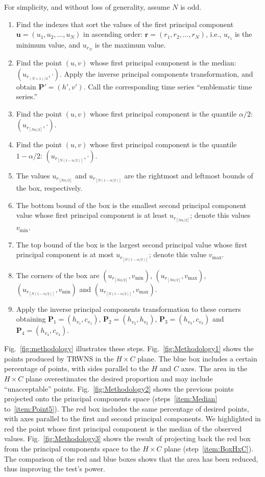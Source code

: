 \documentclass[alpha-refs]{wiley-article}
\begin{document}
For simplicity, and without loss of generality, assume $N$ is odd.
\begin{enumerate}
	\item Find the indexes that sort the values of the first principal component $\bm u=(u_1,u_2,\dots,u_N)$ in ascending order: $\bm r=(r_1,r_2,\dots,r_N)$, i.e., $u_{r_1}$ is the minimum value, and $u_{r_N}$ is the maximum value.
	\item\label{item:Median} Find the point $(u,v)$ whose first principal component is the median: $(u_{r_{(N+1)/2}}, \cdot)$. Apply the inverse principal components transformation, and obtain $\bm P'=(h',v')$. Call the corresponding time series ``emblematic time series.''
	\item\label{item:Point1} Find the point $(u,v)$ whose first principal component is the quantile $\alpha/2$: $(u_{r_{[N\alpha/2]}}, \cdot)$.
	\item\label{item:Point2} Find the point $(u,v)$ whose first principal component is the quantile $1-\alpha/2$: $(u_{r_{[N(1-\alpha/2)]}}, \cdot)$.
	\item\label{item:Point3} The values $u_{r_{[N\alpha/2]}}$ and $u_{r_{[N(1-\alpha/2)]}}$ are the rightmost and leftmost bounds of the box, respectively.
	\item\label{item:Point4} The bottom bound of the box is the smallest second principal component value whose first principal component is at least $u_{r_{[N\alpha/2]}}$; denote this values $v_{\min}$.
	\item\label{item:Point5} The top bound of the box is the largest second principal value whose first principal component is at most $u_{r_{[N(1-\alpha/2)]}}$; denote this value $v_{\max}$.
	\item The corners of the box are 
	$(u_{r_{[N\alpha/2]}}, v_{\min})$, 
	$(u_{r_{[N\alpha/2]}}, v_{\max})$, 
	$(u_{r_{[N(1-\alpha/2)]}}, v_{\min})$ and 
	$(u_{r_{[N(1-\alpha/2)]}},v_{\max})$.
	\item\label{item:BoxHxC} Apply the inverse principal components transformation to these corners obtaining $\bm P_1=(h_{v_1}, c_{v_1})$, $\bm P_2=(h_{v_2},h_{v_2})$, $\bm P_3=(h_{v_3}, c_{v_3})$ and $\bm P_4=(h_{v_4},c_{v_4})$.
\end{enumerate}

Fig.~\ref{fig:methodology} illustrates these steps.
%
Fig.~\ref{fig:Methodology1} shows the points produced by TRWNS in the $H\times C$ plane.
The blue box includes a certain percentage of points, with sides parallel to the $H$ and $C$ axes.
The area in the $H\times C$ plane overestimates the desired proportion and may include ``unacceptable'' points.
%
Fig.~\ref{fig:Methodology2} shows the previous points projected onto the principal components space (steps~\ref{item:Median} to~\ref{item:Point5}).
The red box includes the same percentage of desired points, with axes parallel to the first and second principal components.
We highlighted in red the point whose first principal component is the median of the observed values.
%
Fig.~\ref{fig:Methodology3} shows the result of projecting back the red box from the principal components space to the $H\times C$ plane (step~\ref{item:BoxHxC}).
The comparison of the red and blue boxes shows that the area has been reduced, thus improving the test's power.
\end{document}
